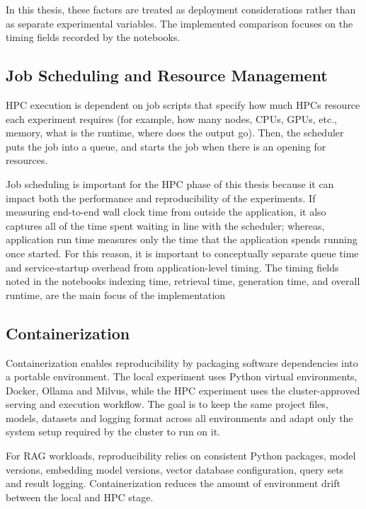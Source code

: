 In this thesis, these factors are treated as deployment considerations rather than as separate experimental variables. The implemented comparison focuses on the timing fields recorded by the notebooks.

\subsection{Job Scheduling and Resource Management}

\ac{HPC} execution is dependent on job scripts that specify how much \acp{HPC} resource each experiment requires (for example, how many nodes, \acp{CPU}, \acp{GPU}, etc., memory, what is the runtime, where does the output go). Then, the scheduler puts the job into a queue, and starts the job when there is an opening for resources.

Job scheduling is important for the \ac{HPC} phase of this thesis because it can impact both the performance and reproducibility of the experiments. If measuring end-to-end wall clock time from outside the application, it also captures all of the time spent waiting in line with the scheduler; whereas, application run time measures only the time that the application spends running once started. For this reason, it is important to conceptually separate queue time and service-startup overhead from application-level timing. The timing fields noted in the notebooks indexing time, retrieval time, generation time, and overall runtime, are the main focus of the implementation

\subsection{Containerization}

Containerization enables reproducibility by packaging software dependencies into a portable environment. The local experiment uses Python virtual environments, Docker, Ollama and Milvus, while the \ac{HPC} experiment uses the cluster-approved serving and execution workflow. The goal is to keep the same project files, models, datasets and logging format across all environments and adapt only the system setup required by the cluster to run on it.

For \ac{RAG} workloads, reproducibility relies on consistent Python packages, model versions, embedding model versions, vector database configuration, query sets and result logging. Containerization reduces the amount of environment drift between the local and \ac{HPC} stage.

